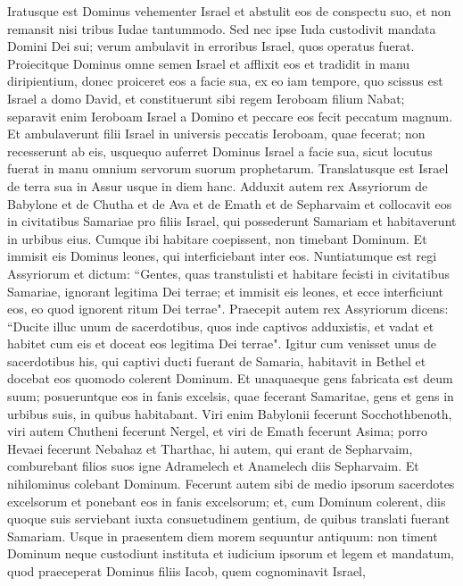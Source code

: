 \begin{biblechapter}
\verse Iratusque est Dominus vehementer Israel et abstulit eos de conspectu suo, et non remansit nisi tribus Iudae tantummodo. 
\verse Sed nec ipse Iuda custodivit mandata Domini Dei sui; verum ambulavit in erroribus Israel, quos operatus fuerat. 
\verse Proiecitque Dominus omne semen Israel et afflixit eos et tradidit in manu diripientium, donec proiceret eos a facie sua, 
\verse ex eo iam tempore, quo scissus est Israel a domo David, et constituerunt sibi regem Ieroboam filium Nabat; separavit enim Ieroboam Israel a Domino et peccare eos fecit peccatum magnum. 
\verse Et ambulaverunt filii Israel in universis peccatis Ieroboam, quae fecerat; non recesserunt ab eis, 
\verse usquequo auferret Dominus Israel a facie sua, sicut locutus fuerat in manu omnium servorum suorum prophetarum. Translatusque est Israel de terra sua in Assur usque in diem hanc. 
\verse Adduxit autem rex Assyriorum de Babylone et de Chutha et de Ava et de Emath et de Sepharvaim et collocavit eos in civitatibus Samariae pro filiis Israel, qui possederunt Samariam et habitaverunt in urbibus eius. 
\verse Cumque ibi habitare coepissent, non timebant Dominum. Et immisit eis Dominus leones, qui interficiebant inter eos. 
\verse Nuntiatumque est regi Assyriorum et dictum: “Gentes, quas transtulisti et habitare fecisti in civitatibus Samariae, ignorant legitima Dei terrae; et immisit eis leones, et ecce interficiunt eos, eo quod ignorent ritum Dei terrae". 
\verse Praecepit autem rex Assyriorum dicens: “Ducite illuc unum de sacerdotibus, quos inde captivos adduxistis, et vadat et habitet cum eis et doceat eos legitima Dei terrae". 
\verse Igitur cum venisset unus de sacerdotibus his, qui captivi ducti fuerant de Samaria, habitavit in Bethel et docebat eos quomodo colerent Dominum. 
\verse Et unaquaeque gens fabricata est deum suum; posueruntque eos in fanis excelsis, quae fecerant Samaritae, gens et gens in urbibus suis, in quibus habitabant. 
\verse Viri enim Babylonii fecerunt Socchothbenoth, viri autem Chutheni fecerunt Nergel, et viri de Emath fecerunt Asima; 
\verse porro Hevaei fecerunt Nebahaz et Tharthac, hi autem, qui erant de Sepharvaim, comburebant filios suos igne Adramelech et Anamelech diis Sepharvaim. 
\verse Et nihilominus colebant Dominum. Fecerunt autem sibi de medio ipsorum sacerdotes excelsorum et ponebant eos in fanis excelsorum; 
\verse et, cum Dominum colerent, diis quoque suis serviebant iuxta consuetudinem gentium, de quibus translati fuerant Samariam. 
\verse Usque in praesentem diem morem sequuntur antiquum: non timent Dominum neque custodiunt instituta et iudicium ipsorum et legem et mandatum, quod praeceperat Dominus filiis Iacob, quem cognominavit Israel, 

\end{biblechapter}
